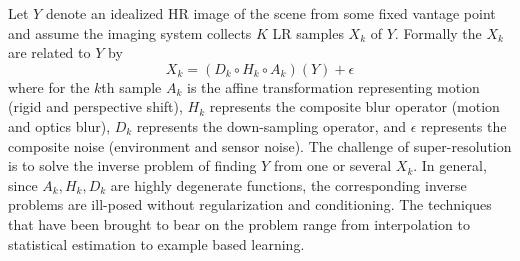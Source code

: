 Let $Y$ denote an idealized HR image of the scene from some fixed vantage point and assume the imaging system collects $K$ LR samples $X_k$ of $Y$.
%
Formally the $X_k$ are related to $Y$ by
\begin{equation}
    X_k = (D_k \circ H_k \circ A_k) (Y) + \epsilon
\end{equation}
where for the $k$th sample $A_k$ is the affine transformation representing motion (rigid and perspective shift), $H_k$ represents the composite blur operator (motion and optics blur), $D_k$ represents the down-sampling operator, and $\epsilon$ represents the composite noise (environment and sensor noise).
%
The challenge of super-resolution is to solve the inverse problem of finding $Y$ from one or several $X_k$.
%
In general, since $A_k, H_k, D_k$ are highly degenerate functions, the corresponding inverse problems are ill-posed without regularization and conditioning.
%
The techniques that have been brought to bear on the problem range from interpolation to statistical estimation to example based learning.
